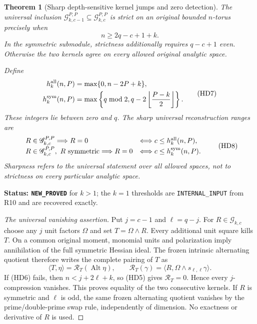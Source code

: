 \documentclass[11pt,a4paper]{article}
\numberwithin{equation}{section}
\newtheorem{theorem}{Theorem}[section]
\theoremstyle{definition}
\theoremstyle{remark}
\begin{document}
\begin{theorem}[Sharp depth-sensitive kernel jumps and zero detection]
\label{thm:r12-depth-sharp-reconstruction}
The universal inclusion
$\mathscr G_{k,c-1}^{P,P}\subseteq\mathscr G_{k,c}^{P,P}$
is strict on an original bounded $n$-torus precisely when
\[
                              n\ge 2q-c+1+k.
 \tag{HD6}
\]
In the symmetric submodule, strictness additionally requires
$q-c+1$ even. Otherwise the two kernels agree on every allowed
original analytic space.

Define
\[
 \begin{split}
 h_k^{\rm all}(n,P)&=\max\{0,n-2P+k\},\\
 h_k^{\rm sym}(n,P)&=
      \max\left\{q\bmod2,
                  q-2\left\lfloor\frac{P-k}{2}\right\rfloor\right\}.
 \end{split}
 \tag{HD7}
\]
These integers lie between zero and $q$. The sharp universal
reconstruction ranges are
\[
 \begin{array}{ll}
 R\in\mathscr G_{k,c}^{P,P}\Longrightarrow R=0
             &\Longleftrightarrow c\le h_k^{\rm all}(n,P),\\[2pt]
 R\in\mathscr G_{k,c}^{P,P},\ R\text{ symmetric}\Longrightarrow R=0
             &\Longleftrightarrow c\le h_k^{\rm sym}(n,P).
 \end{array}
 \tag{HD8}
\]
Sharpness refers to the universal statement over all allowed spaces,
not to strictness on every particular analytic space.
\end{theorem}

\noindent\textbf{Status: \texttt{NEW\_PROVED}} for $k>1$;
the $k=1$ thresholds are \texttt{INTERNAL\_INPUT} from R10 and are
recovered exactly.

\begin{proof}[The universal vanishing assertion]
Put $j=c-1$ and $\ell=q-j$. For $R\in\mathscr G_{k,c}$ choose
any $j$ unit factors $\Omega$ and set $T=\Omega\wedge R$.
Every additional unit square kills $T$. On a common original moment,
monomial units and polarization imply annihilation of the full
symmetric Hessian ideal. The frozen intrinsic alternating quotient
therefore writes the complete pairing of $T$ as
\[
       \langle T,\eta\rangle
             =\mathcal R_T(\operatorname{Alt}\eta),\qquad
       \mathcal R_T(\gamma)
             =\langle R,\Omega\wedge s_{\ell,\ell}\gamma\rangle.
 \tag{HD9}
\]
If (HD6) fails, then $n<j+2\ell+k$, so (HD5) gives
$\mathcal R_T=0$. Hence every $j$-compression vanishes. This proves
equality of the two consecutive kernels. If $R$ is symmetric and
$\ell$ is odd, the same frozen alternating quotient vanishes by
the prime/double-prime swap rule, independently of dimension.
No exactness or derivative of $R$ is used.
\end{proof}
\end{document}
